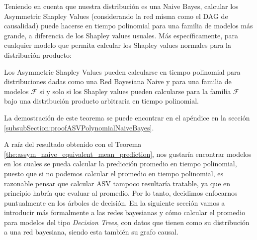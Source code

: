 Teniendo en cuenta que nuestra distribución es una Naive Bayes, calcular los Asymmetric Shapley Values (considerando la red misma como el DAG de causalidad) puede hacerse en tiempo polinomial para una familia de modelos más grande, a diferencia de los Shapley values usuales. Más específicamente, para cualquier modelo que permita calcular los Shapley values normales para la distribución producto:


\begin{theorem}\label{the:assym_naive_equivalent_mean_prediction}
Los Asymmetric Shapley Values pueden calcularse en tiempo polinomial para distribuciones dadas como una Red Bayesiana Naive y para una familia de modelos \(\mathcal{F}\) si y solo si los Shapley values pueden calcularse para la familia \(\mathcal{F}\) bajo una distribución producto arbitraria en tiempo polinomial.
\end{theorem}

La demostración de este teorema se puede encontrar en el apéndice en la sección \ref{subsubSection:proofASVPolynomialNaiveBayes}.

A raíz del resultado obtenido con el Teorema \ref{the:assym_naive_equivalent_mean_prediction}, nos gustaría encontrar modelos en los cuales se pueda calcular la predicción promedio en tiempo polinomial, puesto que si no podemos calcular el promedio en tiempo polinomial, es razonable pensar que calcular ASV tampoco resultaría tratable, ya que en principio habría que evaluar al promedio. Por lo tanto, decidimos enfocarnos puntualmente en los árboles de decisión. En la siguiente sección vamos a introducir más formalmente a las redes bayesianas y cómo calcular el promedio para modelos del tipo \emph{Decision Trees}, con datos que tienen como su distribución a una red bayesiana, siendo esta también su grafo causal. 

